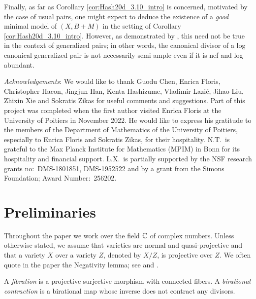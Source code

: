 	Finally, as far as Corollary \ref{cor:Hash20d_3.10_intro} is concerned, motivated by the case of usual pairs, one might expect to deduce the existence of a \emph{good} minimal model of $(X,B+M)$ in the setting of Corollary \ref{cor:Hash20d_3.10_intro}. However, as demonstrated by \cite[Example 2.2]{LX22b}, this need not be true in the context of generalized pairs; in other words, the canonical divisor of a log canonical generalized pair is not necessarily semi-ample even if it is nef and log abundant.
	
	\medskip
	
	\emph{Acknowledgements}: We would like to thank Guodu Chen, Enrica Floris, Christopher Hacon, Jingjun Han, Kenta Hashizume, Vladimir Lazi\'c, Jihao Liu, Zhixin Xie and Sokratis Zikas for useful comments and suggestions. Part of this project was completed when the first author visited Enrica Floris at the University of Poitiers in November 2022. He would like to express his gratitude to the members of the Department of Mathematics of the University of Poitiers, especially to Enrica Floris and Sokratis Zikas, for their hospitality. N.T.\ is grateful to the Max Planck Institute for Mathematics (MPIM) in Bonn for its hospitality and financial support. L.X.\ is partially supported by the NSF research grants no:\ DMS-1801851, DMS-1952522 and by a grant from the Simons Foundation; Award Number:\ 256202.
	
	
	
	
	\section{Preliminaries}
	
	Throughout the paper we work over the field $ \mathbb{C} $ of complex numbers. Unless otherwise stated, we assume that varieties are normal and quasi-projective and that a variety $X$ over a variety $Z$, denoted by $X/Z$, is projective over $Z$. We often quote in the paper the Negativity lemma; see \cite[Lemma 3.39(1)]{KM98} and \cite[Lemma 2.3.26]{Fuj17}.
	
	A \emph{fibration} is a projective surjective morphism with connected fibers. A \emph{birational contraction} is a birational map whose inverse does not contract any divisors.
	
